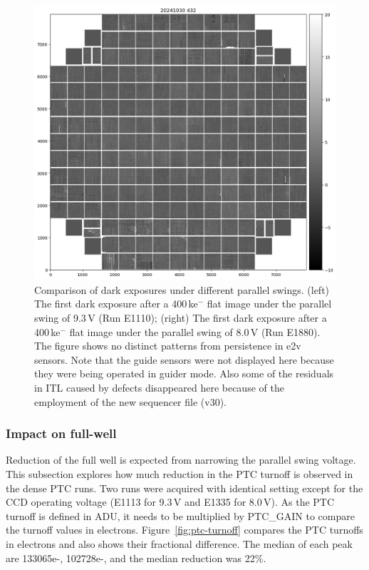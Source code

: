 \begin{figure}[ht]
\begin{minipage}[b]{0.45\textwidth}
\includegraphics[width=\textwidth]{figures/E1880dp80.png}
\end{minipage}
\caption{Comparison of dark exposures under different parallel swings. (left) The first dark exposure after a 400\,ke$^-$ flat image under the parallel swing of 9.3\,V (Run E1110); (right) The first dark exposure after a 400\,ke$^-$ flat image under the parallel swing of 8.0\,V (Run E1880). The figure shows no distinct patterns from persistence in e2v sensors. Note that the guide sensors were not displayed here because they were being operated in guider mode. Also some of the residuals in ITL caused by defects disappeared here because of the employment of the new sequencer file (v30).}
\label{fig:persistence-reduction}
\end{figure}



\subsubsection{Impact on full-well}\label{impact-on-full-well}

Reduction of the full well is expected from narrowing the parallel swing
voltage. This subsection explores how much reduction in the PTC turnoff
is observed in the dense PTC runs. Two runs were acquired with identical
setting except for the CCD operating voltage (E1113 for 9.3\,V and E1335
for 8.0\,V). As the PTC turnoff is defined in ADU, it needs to be
multiplied by PTC\_GAIN to compare the turnoff values in electrons.
Figure~\ref{fig:ptc-turnoff} compares the PTC turnoffs in electrons and also shows their
fractional difference. The median of each peak are 133065e-, 102728e-, and the median reduction was 22\%.

